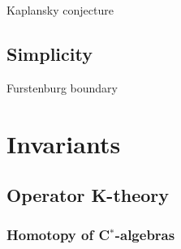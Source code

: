 \documentclass{../../large}
\begin{document}
Kaplansky conjecture












\chapter{Simplicity}


Furstenburg boundary



















\part{Invariants}
\chapter{Operator K-theory}


\section{Homotopy of C$^*$-algebras}
\end{document}
